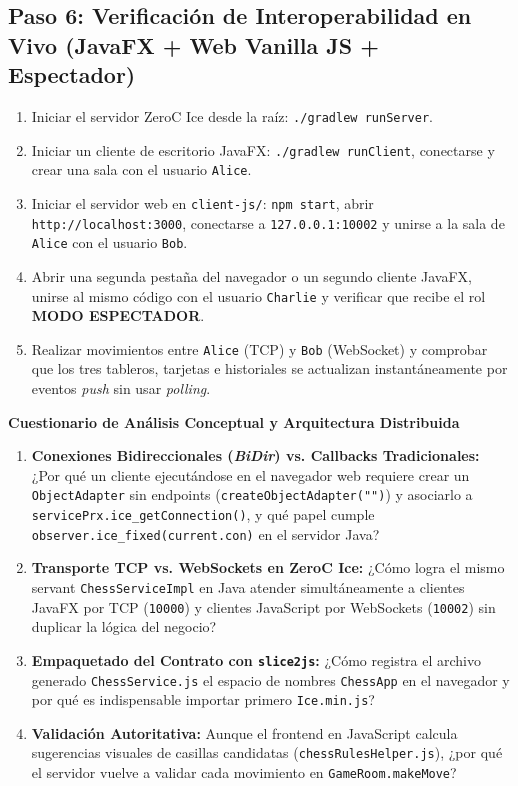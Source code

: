 \documentclass[10pt,letterpaper]{article}
\newcommand{\sectionBadge}[1]{%
  \refstepcounter{section}%
  \vspace{0.24cm}%
  \noindent%
  \colorbox{icesiBlue}{\color{white}\rule[-0.08cm]{0pt}{0.42cm}\hspace{0.16cm}\textbf{\normalsize \thesection}\hspace{0.16cm}}%
  \hspace{0.18cm}%
  {\fontsize{9.5}{12}\selectfont\textbf{\color{icesiDark}#1}}\\[-0.10cm]%
  \noindent{\color{icesiDark}\rule{\textwidth}{0.8pt}}\vspace{0.10cm}%
}
\begin{document}
\subsection*{Paso 6: Verificación de Interoperabilidad en Vivo (JavaFX + Web Vanilla JS + Espectador)}
\begin{enumerate}[leftmargin=*,itemsep=1pt]
    \item Iniciar el servidor ZeroC Ice desde la raíz: \texttt{./gradlew runServer}.
    \item Iniciar un cliente de escritorio JavaFX: \texttt{./gradlew runClient}, conectarse y crear una sala con el usuario \texttt{Alice}.
    \item Iniciar el servidor web en \texttt{client-js/}: \texttt{npm start}, abrir \texttt{http://localhost:3000}, conectarse a \texttt{127.0.0.1:10002} y unirse a la sala de \texttt{Alice} con el usuario \texttt{Bob}.
    \item Abrir una segunda pestaña del navegador o un segundo cliente JavaFX, unirse al mismo código con el usuario \texttt{Charlie} y verificar que recibe el rol \textbf{MODO ESPECTADOR}.
    \item Realizar movimientos entre \texttt{Alice} (TCP) y \texttt{Bob} (WebSocket) y comprobar que los tres tableros, tarjetas e historiales se actualizan instantáneamente por eventos \textit{push} sin usar \textit{polling}.
\end{enumerate}

\sectionBadge{Cuestionario de Análisis Conceptual y Arquitectura Distribuida}

\begin{enumerate}[leftmargin=*,itemsep=2pt]
    \item \textbf{Conexiones Bidireccionales (\textit{BiDir}) vs. Callbacks Tradicionales:} ¿Por qué un cliente ejecutándose en el navegador web requiere crear un \texttt{ObjectAdapter} sin endpoints (\lstinline|createObjectAdapter("")|) y asociarlo a \texttt{servicePrx.ice\_getConnection()}, y qué papel cumple \texttt{observer.ice\_fixed(current.con)} en el servidor Java?
    \item \textbf{Transporte TCP vs. WebSockets en ZeroC Ice:} ¿Cómo logra el mismo servant \texttt{ChessServiceImpl} en Java atender simultáneamente a clientes JavaFX por TCP (\texttt{10000}) y clientes JavaScript por WebSockets (\texttt{10002}) sin duplicar la lógica del negocio?
    \item \textbf{Empaquetado del Contrato con \texttt{slice2js}:} ¿Cómo registra el archivo generado \texttt{ChessService.js} el espacio de nombres \texttt{ChessApp} en el navegador y por qué es indispensable importar primero \texttt{Ice.min.js}?
    \item \textbf{Validación Autoritativa:} Aunque el frontend en JavaScript calcula sugerencias visuales de casillas candidatas (\texttt{chessRulesHelper.js}), ¿por qué el servidor vuelve a validar cada movimiento en \texttt{GameRoom.makeMove}?
\end{enumerate}
\end{document}
